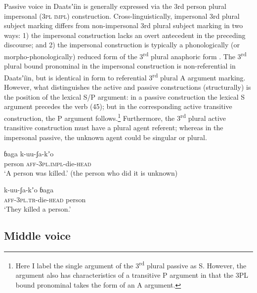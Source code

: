 \documentclass[output=paper]{langsci/langscibook}
\begin{document}
Passive voice in Daatsʼíin is generally expressed via the 3rd person plural impersonal (\textsc{3pl impl}) construction. Cross-linguistically, impersonal 3rd plural subject marking differs from non-impersonal 3rd plural subject marking in two ways: 1) the impersonal construction lacks an overt antecedent in the preceding discourse; and 2) the impersonal construction is typically a phonologically (or morpho-phonologically) reduced form of the 3\textsuperscript{rd} plural anaphoric form \citep[75]{Sieiwerska2010}. The 3\textsuperscript{rd} plural bound pronominal in the impersonal construction is non-referential in Daatsʼíin, but is identical in form to referential 3\textsuperscript{rd} plural A argument marking. However, what distinguishes the active and passive constructions (structurally) is the position of the lexical S/P argument: in a passive construction the lexical S argument precedes the verb (45); but in the corresponding active transitive construction, the P argument follows.\footnote{Here I label the single argument of the 3\textsuperscript{rd} plural passive as S. However, the argument also has characteristics of a transitive P argument in that the 3PL bound pronominal takes the form of an A argument. } Furthermore, the 3\textsuperscript{rd} plural active transitive construction must have a plural agent referent; whereas in the impersonal passive, the unknown agent could be singular or plural.

\ea\label{ex:ahlandc:45}
\gll
ɓaga     k-uu-ʃa-kʼo   \\
person   \textsc{aff}\textsc{{}-3pl.impl-}die\textsc{{}-head} \\
\glt
‘A person was killed.’ (the person who did it is unknown)
\z

\ea\label{ex:ahlandc:46}
\gll
k-uu-ʃa-kʼo     ɓaga  \\
\textsc{aff}\textsc{{}-3pl.tr-}die\textsc{{}-head   } person \\
\glt
‘They killed a person.’
\z

\subsection{Middle voice}\label{sec:ahlandc:6.2}
\end{document}
